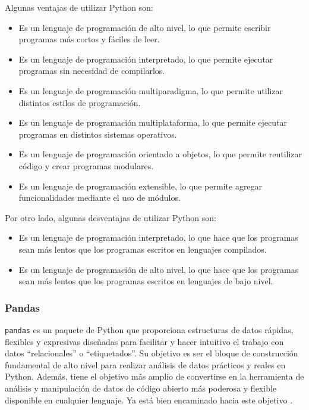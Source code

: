 Algunas ventajas de utilizar Python son:

\begin{itemize}
  \item Es un lenguaje de programación de alto nivel, lo que permite escribir
  programas más cortos y fáciles de leer.
  \item Es un lenguaje de programación interpretado, lo que permite ejecutar
  programas sin necesidad de compilarlos.
  \item Es un lenguaje de programación multiparadigma, lo que permite utilizar
  distintos estilos de programación.
  \item Es un lenguaje de programación multiplataforma, lo que permite ejecutar
  programas en distintos sistemas operativos.
  \item Es un lenguaje de programación orientado a objetos, lo que permite
  reutilizar código y crear programas modulares.
  \item Es un lenguaje de programación extensible, lo que permite agregar
  funcionalidades mediante el uso de módulos.
\end{itemize}

Por otro lado, algunas desventajas de utilizar Python son:

\begin{itemize}
  \item Es un lenguaje de programación interpretado, lo que hace que los
  programas sean más lentos que los programas escritos en lenguajes compilados.
  \item Es un lenguaje de programación de alto nivel, lo que hace que los
  programas sean más lentos que los programas escritos en lenguajes de bajo nivel.
\end{itemize}

\subsubsection{Pandas}

\texttt{pandas} es un paquete de Python que proporciona estructuras de datos
rápidas, flexibles y expresivas diseñadas para facilitar y hacer intuitivo el
trabajo con datos ``relacionales'' o ``etiquetados''. Su objetivo es ser el
bloque de construcción fundamental de alto nivel para realizar análisis de datos
prácticos y reales en Python. Además, tiene el objetivo más amplio de convertirse
en la herramienta de análisis y manipulación de datos de código abierto más
poderosa y flexible disponible en cualquier lenguaje. Ya está bien encaminado
hacia este objetivo \cite{mckinney2011pandas}.

